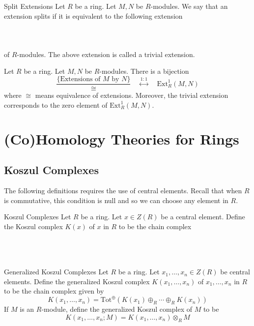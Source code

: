 \documentclass[a4paper]{article}
\begin{document}
\begin{defn}{Split Extensions}{} Let $R$ be a ring. Let $M,N$ be $R$-modules. We say that an extension splits if it is equivalent to the following extension \\~\\
 \\~\\
of $R$-modules. The above extension is called a trivial extension. 
\end{defn}

\begin{thm}{}{} Let $R$ be a ring. Let $M,N$ be $R$-modules. There is a bijection $$\frac{\{\text{Extensions of }M\text{ by }N\}}{\cong}\;\;\;\;\overset{1:1}{\longleftrightarrow}\;\;\;\;\text{Ext}_R^1(M,N)$$ where $\cong$ means equivalence of extensions. Moreover, the trivial extension corresponds to the zero element of $\text{Ext}_R^1(M,N)$. 
\end{thm}

\pagebreak
\section{(Co)Homology Theories for Rings}
\subsection{Koszul Complexes}
The following definitions requires the use of central elements. Recall that when $R$ is commutative, this condition is null and so we can choose any element in $R$. 

\begin{defn}{Koszul Complexes}{} Let $R$ be a ring. Let $x\in Z(R)$ be a central element. Define the Koszul complex $K(x)$ of $x$ in $R$ to be the chain complex \\~\\
 \\~\\
\end{defn}

\begin{defn}{Generalized Koszul Complexes}{} Let $R$ be a ring. Let $x_1,\dots,x_n\in Z(R)$ be central elements. Define the generalized Koszul complex $K(x_1,\dots,x_n)$ of $x_1,\dots,x_n$ in $R$ to be the chain complex given by $$K(x_1,\dots,x_n)=\text{Tot}^\oplus\left(K(x_1)\oplus_R\cdots\oplus_R K(x_n)\right)$$ If $M$ is an $R$-module, define the generalized Koszul complex of $M$ to be $$K(x_1,\dots,x_n;M)=K(x_1,\dots,x_n)\otimes_R M$$
\end{defn}
\end{document}
